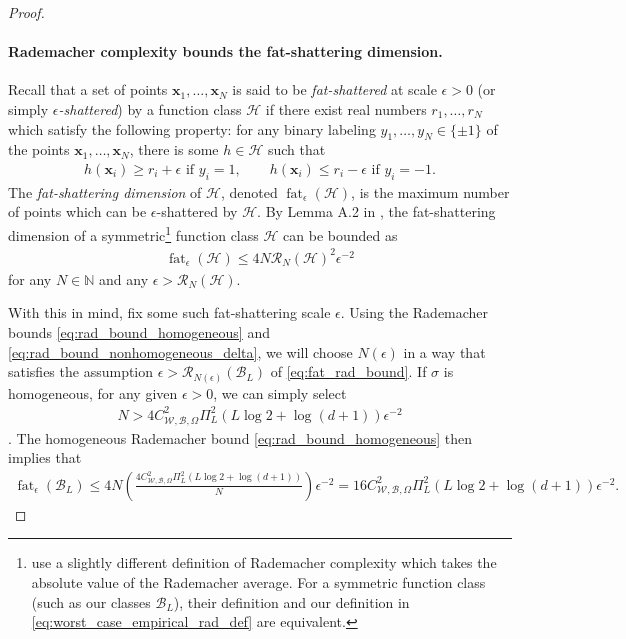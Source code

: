\documentclass{article}
\DeclareMathOperator{\fat}{\mathrm{fat}}
\def\vx{{\bm{x}}}
\def\cB{{\mathcal{B}}}
\def\cH{{\mathcal{H}}}
\def\cR{{\mathcal{R}}}
\def\cW{{\mathcal{W}}}
\def\bN{{\mathbb{N}}}
\begin{document}
\begin{appendices}
\begin{proof}
    \paragraph{Rademacher complexity bounds the fat-shattering dimension.} Recall that a set of points $\vx_1, \dots, \vx_N$ is said to be \textit{fat-shattered} at scale $\epsilon > 0$ (or simply \textit{$\epsilon$-shattered}) by a function class $\cH$ if there exist real numbers $r_1, \dots, r_N$ which satisfy the following property: for any binary labeling $y_1, \dots, y_N \in \{ \pm 1 \}$ of the points $\vx_1, \dots, \vx_N$, there is some $h \in \cH$ such that
    \begin{align}
        \textrm{$h(\vx_i) \geq r_i + \epsilon$ if $y_i = 1$}, \qquad \textrm{$h(\vx_i) \leq r_i - \epsilon$ if $y_i = -1$}.
    \end{align}
    The \textit{fat-shattering dimension} of $\cH$, denoted $\fat_\epsilon(\cH)$, is the maximum number of points which can be $\epsilon$-shattered by $\cH$. By Lemma A.2 in \cite{srebro2010smoothness}, the fat-shattering dimension of a symmetric\footnote{\cite{srebro2010smoothness} use a slightly different definition of Rademacher complexity which takes the absolute value of the Rademacher average. For a symmetric function class (such as our classes $\cB_L$), their definition and our definition in \eqref{eq:worst_case_empirical_rad_def} are equivalent.} function class $\cH$ can be bounded as
    \begin{align} \label{eq:fat_rad_bound}
        \fat_\epsilon(\cH) \leq 4N \cR_N(\cH)^2 \epsilon^{-2}
    \end{align}
    for any $N \in \bN$ and any $\epsilon > \cR_N(\cH)$. 
    
    With this in mind, fix some such fat-shattering scale $\epsilon$. Using the Rademacher bounds \eqref{eq:rad_bound_homogeneous} and \eqref{eq:rad_bound_nonhomogeneous_delta}, we will choose $N(\epsilon)$ in a way that satisfies the assumption $\epsilon > \cR_{N(\epsilon)} (\cB_L)$ of \eqref{eq:fat_rad_bound}. If $\sigma$ is homogeneous, for any given $\epsilon > 0$, we can simply select
    \begin{align}
        N > 4 C_{\cW, \cB, \Omega}^2 \Pi_L^2 \left(L \log 2 + \log(d+1) \right) \epsilon^{-2}
    \end{align}.
    The homogeneous Rademacher bound \eqref{eq:rad_bound_homogeneous} then implies that
    \begin{align} \label{eq:fat_rad_bound_homogeneous}
        \fat_{\epsilon}(\cB_L) \leq 4N \left( \frac{4 C_{\cW, \cB, \Omega}^2 \Pi_L^2 \left(L \log 2 + \log(d+1) \right)}{N} \right) \epsilon^{-2} = 16 C_{\cW, \cB, \Omega}^2 \Pi_L^2 \left(L \log 2 + \log(d+1) \right) \epsilon^{-2}.
    \end{align}
    


\end{proof}
\end{appendices}
\end{document}
